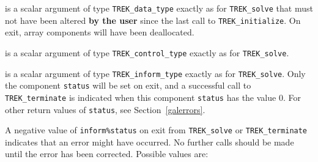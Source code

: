 \documentclass{galahad}
\newcommand{\packagename}{TREK}
\begin{document}
\begin{description}

 is a scalar \intentinout argument of type
{\tt \packagename\_data\_type}
exactly as for
{\tt \packagename\_solve}
that must not have been altered {\bf by the user} since the last call to
{\tt \packagename\_initialize}.
On exit, array components will have been deallocated.

 is a scalar \intentin argument of type
{\tt \packagename\_control\_type}
exactly as for
{\tt \packagename\_solve}.

 is a scalar \intentout argument of type
{\tt \packagename\_inform\_type}
exactly as for
{\tt \packagename\_solve}.
Only the component {\tt status} will be set on exit, and a
successful call to
{\tt \packagename\_terminate}
is indicated when this  component {\tt status} has the value 0.
For other return values of {\tt status}, see Section~\ref{galerrors}.

\end{description}


\galerrors
A negative value of  {\tt inform\%status} on exit from
{\tt \packagename\_solve}
or
{\tt \packagename\_terminate}
indicates that an error might have occurred. No further calls should be made
until the error has been corrected. Possible values are:
\end{document}
